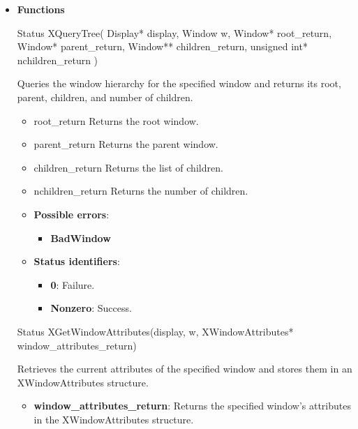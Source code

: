 \documentclass{report}
\begin{document}
\begin{itemize}
        \item \textbf{Functions}
            \begin{cppcode}
            Status XQueryTree(
                Display* display,
                Window w,
                Window* root_return,
                Window* parent_return,
                Window** children_return,
                unsigned int* nchildren_return
            )
            \end{cppcode}
            \bigbreak \noindent
            Queries the window hierarchy for the specified window and returns its root, parent, children, and number of children.
            \begin{itemize}
                \item root\_return Returns the root window.
                \item parent\_return Returns the parent window.
                \item children\_return Returns the list of children.
                \item nchildren\_return Returns the number of children.
            \end{itemize}
            \begin{itemize}
                \item \textbf{Possible errors}:
                    \begin{itemize}
                        \item \textbf{BadWindow}
                    \end{itemize}
                \item \textbf{Status identifiers}:
                    \begin{itemize}
                        \item \textbf{0}: Failure.
                        \item \textbf{Nonzero}: Success.
                    \end{itemize}
            \end{itemize}

            \begin{cppcode}
                Status XGetWindowAttributes(display, w, XWindowAttributes* window_attributes_return)
            \end{cppcode}
            \bigbreak \noindent
            Retrieves the current attributes of the specified window and stores them in an XWindowAttributes structure.

            \begin{itemize}
                \item \textbf{window\_attributes\_return}: Returns the specified window’s attributes in the XWindowAttributes structure.
            \end{itemize}


\end{itemize}
\end{document}
